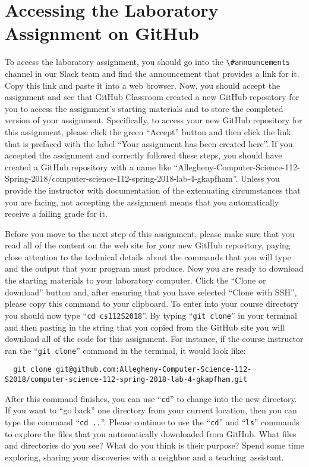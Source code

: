 \documentclass[11pt]{article}
\newcommand{\command}[1]{``\lstinline{#1}''}
\newcommand{\channel}[1]{\lstinline{#1}}
\newcommand{\step}[1]{``{#1}''}
\begin{document}
\section*{Accessing the Laboratory Assignment on GitHub}

To access the laboratory assignment, you should go into the
\channel{\#announcements} channel in our Slack team and find the announcement
that provides a link for it. Copy this link and paste it into a web browser.
Now, you should accept the assignment and see that GitHub Classroom created a
new GitHub repository for you to access the assignment's starting materials and
to store the completed version of your assignment. Specifically, to access your
new GitHub repository for this assignment, please click the green ``Accept''
button and then click the link that is prefaced with the label ``Your assignment
has been created here''. If you accepted the assignment and correctly followed
these steps, you should have created a GitHub repository with a name like
``Allegheny-Computer-Science-112-Spring-2018/computer-science-112-spring-2018-lab-4-gkapfham''.
Unless you provide the instructor with documentation of the extenuating
circumstances that you are facing, not accepting the assignment means that you
automatically receive a failing grade for it.

Before you move to the next step of this assignment, please make sure that you
read all of the content on the web site for your new GitHub repository, paying
close attention to the technical details about the commands that you will type
and the output that your program must produce. Now you are ready to download the
starting materials to your laboratory computer. Click the ``Clone or download''
button and, after ensuring that you have selected ``Clone with SSH'', please
copy this command to your clipboard. To enter into your course directory you
should now type \command{cd cs112S2018}. By typing \command{git clone} in your
terminal and then pasting in the string that you copied from the GitHub site you
will download all of the code for this assignment. For instance, if the course
instructor ran the \command{git clone} command in the terminal, it would look
like:

\begin{lstlisting}
  git clone git@github.com:Allegheny-Computer-Science-112-S2018/computer-science-112-spring-2018-lab-4-gkapfham.git
\end{lstlisting}

After this command finishes, you can use \command{cd} to change into the new
directory. If you want to \step{go back} one directory from your current
location, then you can type the command \command{cd ..}. Please continue to use
the \command{cd} and \command{ls} commands to explore the files that you
automatically downloaded from GitHub. What files and directories do you see?
What do you think is their purpose? Spend some time exploring, sharing your
discoveries with a neighbor and a \mbox{teaching assistant}.
\end{document}
